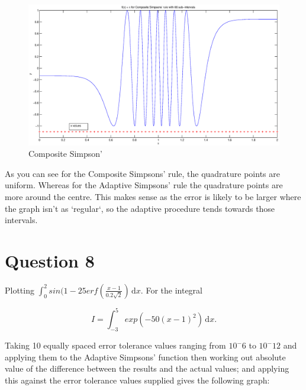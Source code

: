 \documentclass[fleqn]{report}
\begin{document}
\pagebreak

\begin{figure}[h!]
\begin{center}
    \centerline{\includegraphics[width=1.8\textwidth]{graphs/q7composite.eps}}
    \caption{Composite Simpson'}
\end{center}
\end{figure}

As you can see for the Composite Simpsons' rule, the quadrature points 
are uniform. Whereas for the Adaptive Simpsons' rule the quadrature points
are more around the centre. This makes sense as the error
is likely to be larger where the graph isn't as `regular`, so the
adaptive procedure tends towards those intervals.

\pagebreak

\section{Question 8}

Plotting $ \int_0^2 \! sin(1 - 25erf(\frac{x-1}{0.2\sqrt{2}}) \,\mathrm{d}x.$ 
For the integral 

\begin{equation*}
I = \int_{-3}^5 \! exp(-50(x-1)^{2}) \,\mathrm{d}x.
\end{equation*}

Taking 10 equally spaced error tolerance values ranging from $10^-6$ to $10^-12$
and applying them to the Adaptive Simpsons' function then working out
absolute value of the difference between the results and the actual values; and applying
this against the error tolerance values supplied gives the following graph:

\newpage
\end{document}
